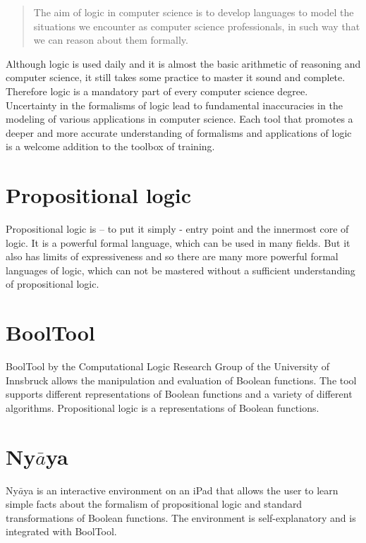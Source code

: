 
\begin{quote}
The aim of logic in computer science is to develop languages 
to model the situations we encounter as computer science professionals, 
in such way that we can reason about them formally. \cite{Huth:2004:LCS:975331}
\end{quote}

Although logic is used daily and it is almost the basic arithmetic of reasoning and computer science, 
it still takes some practice to master it sound and complete. 
Therefore logic is a mandatory part of every computer science degree. Uncertainty in the formalisms of logic lead to fundamental inaccuracies in the modeling of various applications in computer science. Each tool that promotes a deeper and more accurate understanding of formalisms and applications of logic 
is a welcome addition to the toolbox of training.

\section{Propositional logic}

Propositional logic is – to put it simply - entry point and the innermost core of logic. 
It is a powerful formal language, which can be used in many fields. 
But it also has limits of expressiveness and so 
there are many more powerful formal languages of logic, 
which can not be mastered without a sufficient understanding  of propositional logic.

\section{BoolTool}

BoolTool by the Computational Logic Research Group of the University of Innsbruck allows the manipulation and evaluation of Boolean functions. The tool supports different representations of Boolean functions and a variety of different algorithms.
Propositional logic is a representations of Boolean functions.

\section{Ny$\bar{a}$ya}

Ny$\bar{a}$ya is an interactive environment on an iPad that allows the user to learn simple facts about the formalism of propositional logic and standard transformations of Boolean functions. The environment is self-explanatory and is integrated with BoolTool. 


%
